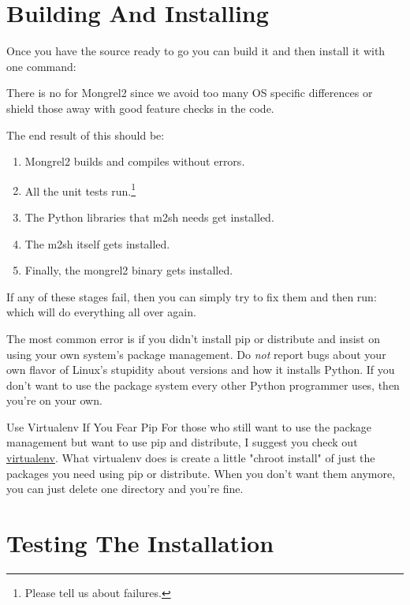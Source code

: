 \section{Building And Installing}

Once you have the source ready to go you can build it and then install it with
one command:  

There is no  for Mongrel2 since we avoid too many OS specific
differences or shield those away with good feature checks in the code.

The end result of this should be:

\begin{enumerate}
\item Mongrel2 builds and compiles without errors.
\item All the unit tests run.\footnote{Please tell us about failures.}
\item The Python libraries that m2sh needs get installed.
\item The m2sh itself gets installed.
\item Finally, the mongrel2 binary gets installed.
\end{enumerate}

If any of these stages fail, then you can simply try to fix them and then
run:   which will do everything all over again.

The most common error is if you didn't install pip or distribute and insist
on using your own system's package management.  Do \emph{not} report bugs about
your own flavor of Linux's stupidity about versions and how it installs Python.
If you don't want to use the package system every other Python programmer uses,
then you're on your own.

\begin{aside}{Use Virtualenv If You Fear Pip}
For those who still want to use the package management but want to use pip and
distribute, I suggest you check out \href{http://pypi.python.org/pypi/virtualenv}{virtualenv}.
What virtualenv does is create a little "chroot install" of just the packages
you need using pip or distribute.  When you don't want them anymore, you can just
delete one directory and you're fine.
\end{aside}


\section{Testing The Installation}

